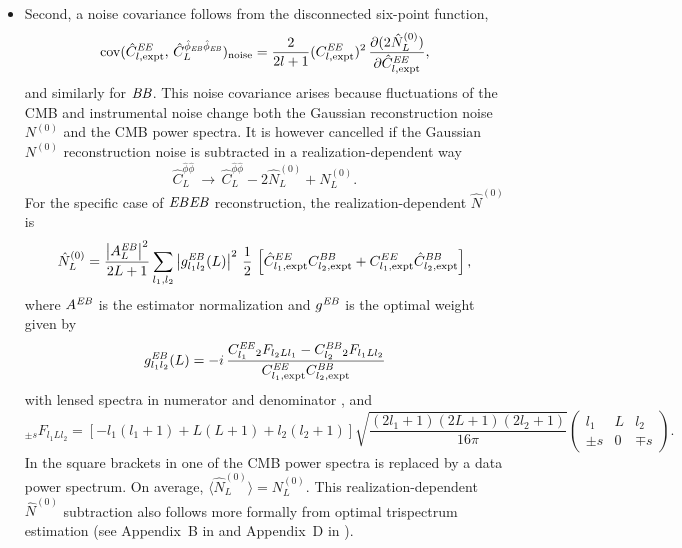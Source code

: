 \begin{itemize}
\item Second, a noise covariance follows from the disconnected six-point function,
\begin{equation}
  \label{eq:2}
\mathrm{cov}(\hat C^{\mathit{EE}}_{l,\mathrm{expt}}, \,\hat C^{\hat\phi_{\mathit{EB}}\hat\phi_{\mathit{EB}}}_L)_\mathrm{noise}
=
\frac{2}{2l+1}(C^{\mathit{EE}}_{l,\mathrm{expt}})^2 \, \frac{\partial(2\hat N^{(0)}_L)}{\partial \hat C^{\mathit{EE}}_{l,\mathrm{expt}}},
\end{equation}
and similarly for $\mathit{BB}$.
This noise covariance arises because fluctuations of the CMB and instrumental noise change both the Gaussian reconstruction noise $N^{(0)}$ and the CMB power spectra.  It is however cancelled if the Gaussian $N^{(0)}$ reconstruction noise is subtracted in a realization-dependent way \cite{Dvorkin:2008tf,Hanson:2010rp,Namikawa:2012pe,Schmittfull:2013uea}
\begin{equation}
  \label{eq:RDN0procedure}
  \hat C^{\hat\phi\hat\phi}_L \,\rightarrow \,
\hat C^{\hat\phi\hat\phi}_L - 2 \hat N^{(0)}_L + N^{(0)}_{L}.
\end{equation}
For the specific case of $\mathit{EB}\mathit{EB}$ reconstruction, the realization-dependent $\hat N^{(0)}$ is 
\begin{equation}
  \label{eq:RDN0}
  \hat N^{(0)}_L = \frac{\left|A_L^{\mathit{EB}}\right|^2}{2L+1}\sum_{l_1,l_2} 
\left| g^{\mathit{EB}}_{l_1l_2}(L) \right|^2
\,\frac{1}{2}\,\left[\hat C^{EE}_{l_1,\mathrm{expt}} C^{\mathit{BB}}_{l_2,\mathrm{expt}}+ C^{EE}_{l_1,\mathrm{expt}} \hat C^{\mathit{BB}}_{l_2,\mathrm{expt}}\right],
\end{equation}
where $A^{\mathit{EB}}$ is the estimator normalization and $g^{\mathit{EB}}$ is the optimal weight given by \cite{Okamoto:2003zw}
\begin{equation}
  \label{eq:gweight}
  g^{\mathit{EB}}_{l_1l_2}(L) = -i\,\frac{C^{\mathit{EE}}_{l_1} {}_{2}F_{l_2Ll_1} - C^{\mathit{BB}}_{l_2}{}_2F_{l_1Ll_2}}{C^{\mathit{EE}}_{l_1,\mathrm{expt}}C^{\mathit{BB}}_{l_2,\mathrm{expt}}}
\end{equation}
with lensed spectra in numerator and denominator \cite{Lewis:2011fk,Hanson:2010rp}, and
\begin{equation}
  \label{eq:BigF}
  {}_{\pm
    s}F_{l_1Ll_2}=[-l_1(l_1+1)+L(L+1)+l_2(l_2+1)]\sqrt{\frac{(2l_1+1)
      (2L+1) (2l_2+1)}{16\pi}}
\left( \begin{matrix} 
l_1 & L & l_2 \\ 
 \pm s & 0 & \mp s
\end{matrix} \right).
\end{equation}
In the square brackets in  one of the CMB power spectra is replaced by a data power spectrum. On average,  $\langle\hat N^{(0)}_L\rangle=N^{(0)}_L$.  This realization-dependent $\hat N^{(0)}$ subtraction also follows more formally from optimal trispectrum estimation (see Appendix~B in \cite{Schmittfull:2013uea} and Appendix~D in \cite{Ade:2013tyw}).

\end{itemize}
